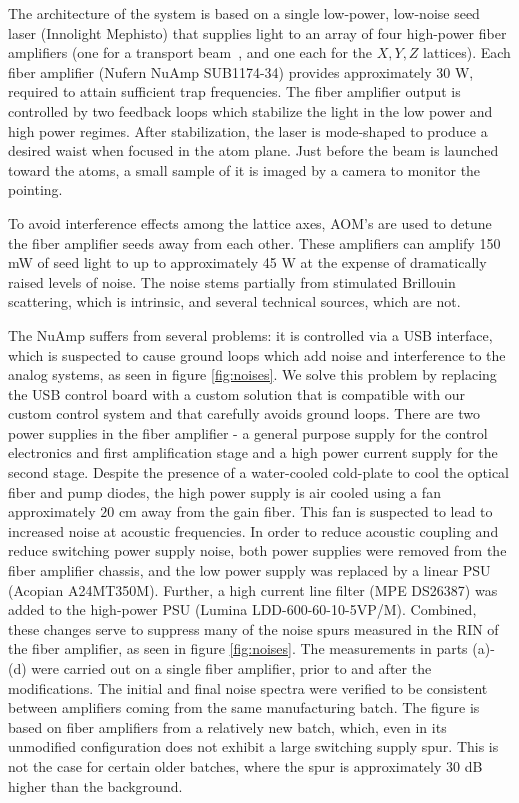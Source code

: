 \documentclass[twocolumn,aps,pra,showpacs,preprintnumbers,bibnotes]{revtex4-1}
\begin{document}
The architecture of the system is based on a single low-power, low-noise seed laser (Innolight Mephisto) that supplies light to an array of four high-power fiber amplifiers (one for a transport beam~\cite{Huber2014}, and one each for the $X,Y,Z$ lattices)\cite{Parsons2015}.
Each fiber amplifier (Nufern NuAmp SUB1174-34) provides approximately 30 W, required to attain sufficient trap frequencies.
The fiber amplifier output is controlled by two feedback loops which stabilize the light in the low power and high power regimes.
After stabilization, the laser is mode-shaped to produce a desired waist when focused in the atom plane. 
Just before the beam is launched toward the atoms, a small sample of it is imaged by a camera to monitor the pointing.

To avoid interference effects among the lattice axes, AOM's are used to detune the fiber amplifier seeds away from each other.
These amplifiers can amplify 150 mW of seed light to up to approximately 45 W at the expense of dramatically raised levels of noise. 
The noise stems partially from stimulated Brillouin scattering, which is intrinsic, and several technical sources, which are not.

The NuAmp suffers from several problems: it is controlled via a USB interface, which is suspected to cause ground loops which add noise and interference to the analog systems, as seen in figure \ref{fig:noises}.
We solve this problem by replacing the USB control board with a custom solution that is compatible with our custom control system and that carefully avoids ground loops. 
There are two power supplies in the fiber amplifier - a general purpose supply for the control electronics and first amplification stage and a high power current supply for the second stage. 
Despite the presence of a water-cooled cold-plate to cool the optical fiber and pump diodes, the high power supply is air cooled using a fan approximately $20$ cm away from the gain fiber. 
This fan is suspected to lead to increased noise at acoustic frequencies.
In order to reduce acoustic coupling and reduce switching power supply noise, both power supplies were removed from the fiber amplifier chassis, and the low power supply was replaced by a linear PSU (Acopian A24MT350M). 
Further, a high current line filter (MPE DS26387) was added to the high-power PSU (Lumina LDD-600-60-10-5VP/M).
Combined, these changes serve to suppress many of the noise spurs measured in the RIN of the fiber amplifier, as seen in figure \ref{fig:noises}. 
The measurements in parts (a)-(d) were carried out on a single fiber amplifier, prior to and after the modifications. The initial and final noise spectra were verified to be consistent between amplifiers coming from the same manufacturing batch.
The figure is based on fiber amplifiers from a relatively new batch, which, even in its unmodified configuration does not exhibit a large switching supply spur. 
This is not the case for certain older batches, where the spur is approximately 30 dB higher than the background.
\end{document}
